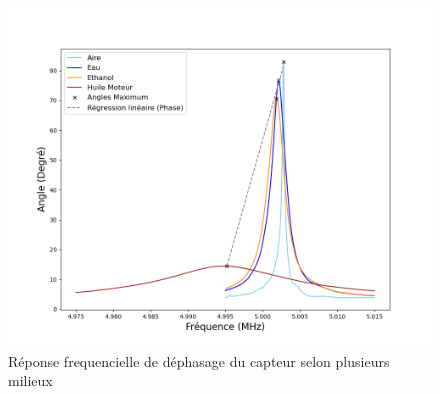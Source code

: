 \begin{figure}[H]
    \centering
    \includegraphics[width=\textwidth]{assets/figures/reponsePhase.png}
    \caption{Réponse frequencielle de déphasage du capteur selon plusieurs milieux}
    \label{fig:Réponse frequencielle déphasage}
\end{figure}


